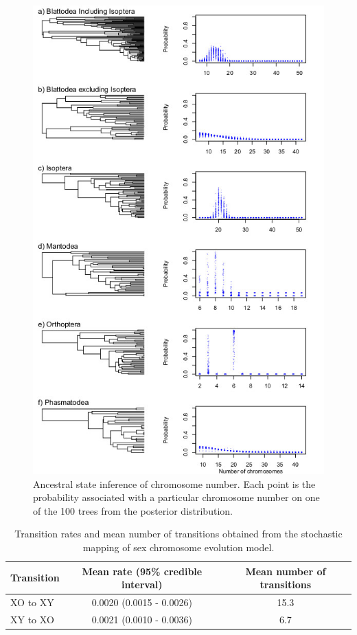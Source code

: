 \begin{figure}
\centering \includegraphics[width=.7\textwidth]{figures/asr_plot.jpg}
\caption{Ancestral state inference of chromosome number. Each point is the probability associated with a particular chromosome number on one of the 100 trees from the posterior distribution.}
\label{fig:asr}
\end{figure}

\begin{table}[ht]
\centering
\begin{tabular}{lcc}
\hline
\textbf{Transition} & \textbf{Mean rate (95\% credible interval)} & \textbf{Mean number of transitions} \\ \hline
XO to XY            & 0.0020 (0.0015 - 0.0026)                    & 15.3                                \\
XY to XO            & 0.0021 (0.0010 - 0.0036)                    & 6.7                                 \\ \hline
\end{tabular}
\caption{Transition rates and mean number of transitions obtained from the stochastic mapping of sex chromosome evolution model.}
\label{tab:simmap.summary}
\end{table}


